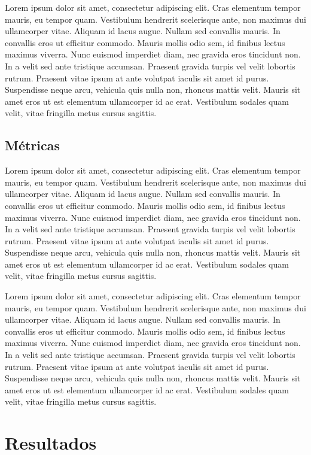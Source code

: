 \documentclass[conference]{IEEEtran}
\begin{document}
Lorem ipsum dolor sit amet, consectetur adipiscing elit. Cras elementum tempor mauris, eu tempor quam. Vestibulum hendrerit scelerisque ante, non maximus dui ullamcorper vitae. Aliquam id lacus augue. Nullam sed convallis mauris. In convallis eros ut efficitur commodo. Mauris mollis odio sem, id finibus lectus maximus viverra. Nunc euismod imperdiet diam, nec gravida eros tincidunt non. In a velit sed ante tristique accumsan. Praesent gravida turpis vel velit lobortis rutrum. Praesent vitae ipsum at ante volutpat iaculis sit amet id purus. Suspendisse neque arcu, vehicula quis nulla non, rhoncus mattis velit. Mauris sit amet eros ut est elementum ullamcorper id ac erat. Vestibulum sodales quam velit, vitae fringilla metus cursus sagittis.

\subsection{Métricas}

Lorem ipsum dolor sit amet, consectetur adipiscing elit. Cras elementum tempor mauris, eu tempor quam. Vestibulum hendrerit scelerisque ante, non maximus dui ullamcorper vitae. Aliquam id lacus augue. Nullam sed convallis mauris. In convallis eros ut efficitur commodo. Mauris mollis odio sem, id finibus lectus maximus viverra. Nunc euismod imperdiet diam, nec gravida eros tincidunt non. In a velit sed ante tristique accumsan. Praesent gravida turpis vel velit lobortis rutrum. Praesent vitae ipsum at ante volutpat iaculis sit amet id purus. Suspendisse neque arcu, vehicula quis nulla non, rhoncus mattis velit. Mauris sit amet eros ut est elementum ullamcorper id ac erat. Vestibulum sodales quam velit, vitae fringilla metus cursus sagittis.

Lorem ipsum dolor sit amet, consectetur adipiscing elit. Cras elementum tempor mauris, eu tempor quam. Vestibulum hendrerit scelerisque ante, non maximus dui ullamcorper vitae. Aliquam id lacus augue. Nullam sed convallis mauris. In convallis eros ut efficitur commodo. Mauris mollis odio sem, id finibus lectus maximus viverra. Nunc euismod imperdiet diam, nec gravida eros tincidunt non. In a velit sed ante tristique accumsan. Praesent gravida turpis vel velit lobortis rutrum. Praesent vitae ipsum at ante volutpat iaculis sit amet id purus. Suspendisse neque arcu, vehicula quis nulla non, rhoncus mattis velit. Mauris sit amet eros ut est elementum ullamcorper id ac erat. Vestibulum sodales quam velit, vitae fringilla metus cursus sagittis.

\section{Resultados}
\end{document}
